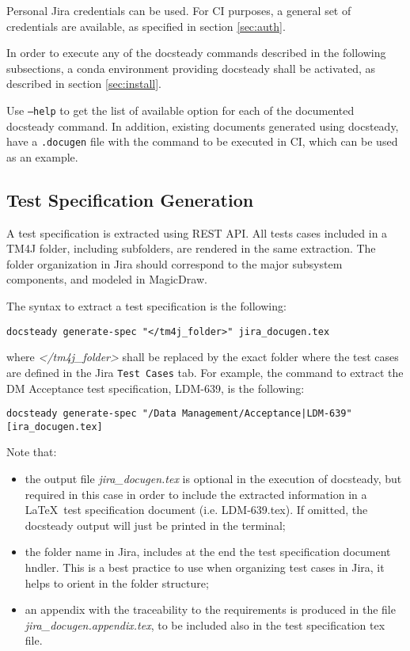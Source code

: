 \documentclass[DM]{lsstdoc}
\begin{document}
Personal Jira credentials can be used. 
For CI purposes, a general set of credentials are available, as specified in section \ref{sec:auth}.

In order to execute any of the docsteady commands described in the following subsections, a conda environment providing docsteady shall be activated, as described in section \ref{sec:install}.

Use \texttt{--help} to get the list of available option for each of the documented docsteady command.
In addition, existing documents generated using docsteady, have a \texttt{.docugen} file with the command to be executed in CI, which can be used as an example.



\subsection{Test Specification Generation}

A test specification is extracted using REST API.
All tests cases included in a TM4J folder, including subfolders, are rendered in the same extraction.
The folder organization in Jira should correspond to the major subsystem components, and modeled in MagicDraw.

The syntax to extract a test specification is the following:

\texttt{docsteady generate-spec "</tm4j\_folder>" jira\_docugen.tex}

where \textit{</tm4j\_folder>} shall be replaced by the exact folder where the test cases are defined in the Jira \texttt{Test Cases} tab.
For example, the command to extract the DM Acceptance test specification, LDM-639, is the following:

\texttt{docsteady generate-spec "/Data Management/Acceptance|LDM-639" [ira\_docugen.tex]}

Note that:
\begin{itemize}
\item the output file \textit{jira\_docugen.tex} is optional in the execution of docsteady, but required in this case in order to include the extracted information in a \LaTeX~test specification document (i.e. LDM-639.tex). If omitted, the docsteady  output will just be printed in the terminal;
\item the folder name in Jira, includes at the end the test specification document hndler. This is a best practice to use when organizing test cases in Jira, it helps to orient in the folder structure;
\item an appendix with the traceability to the requirements is produced in the file \textit{jira\_docugen.appendix.tex}, to be included also in the test specification tex file. 
\end{itemize}
\end{document}
